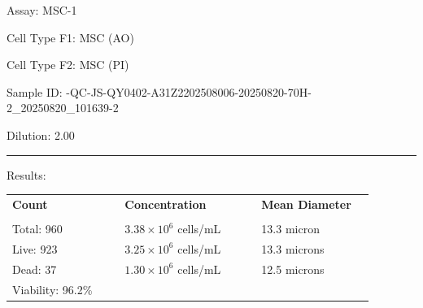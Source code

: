 \documentclass[UTF8,10pt,a4paper,fontset=fandol]{ctexart}
\newcommand{\fieldvalue}[1]{#1}
\begin{document}
\newpage

\noindent
Assay: \fieldvalue{MSC-1}

\medskip
\noindent
Cell Type F1: \fieldvalue{MSC (AO)}

\noindent
Cell Type F2: \fieldvalue{MSC (PI)}

\medskip
\noindent
Sample ID: \fieldvalue{-QC-JS-QY0402-A31Z2202508006-20250820-70H-2\_20250820\_101639-2}

\noindent
Dilution: \fieldvalue{2.00}

\medskip
\noindent\rule{\linewidth}{0.4pt}

\noindent Results:

\medskip
\noindent
\begin{tabular}{@{}p{0.29\linewidth}p{0.34\linewidth}p{0.29\linewidth}@{}}
\textbf{Count} & \textbf{Concentration} & \textbf{Mean Diameter} \\
\underline{\hspace{0.21\linewidth}} &
\underline{\hspace{0.24\linewidth}} &
\underline{\hspace{0.22\linewidth}} \\[2pt]

Total:
\fieldvalue{960}
&
\fieldvalue{$3.38\times10^{6}$ cells/mL}
&
\fieldvalue{13.3 micron}
\\

Live:
\fieldvalue{923}
&
\fieldvalue{$3.25\times10^{6}$ cells/mL}
&
\fieldvalue{13.3 microns}
\\

Dead:
\fieldvalue{37}
&
\fieldvalue{$1.30\times10^{6}$ cells/mL}
&
\fieldvalue{12.5 microns}
\\

Viability:
\fieldvalue{96.2\%}
&
&
\end{tabular}
\end{document}
